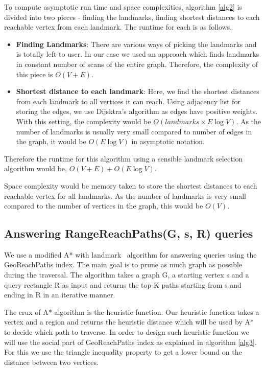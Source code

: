 {\begin{algorithm}[t]
\begin{scriptsize}
\end{scriptsize}
\end{algorithm}

To compute asymptotic run time and space complexities, algorithm \ref{alg2} is divided into two pieces - finding the landmarks, finding shortest distances to each reachable vertex from each landmark. The runtime for each is as follows,
\begin{itemize}
	\item \textbf{Finding Landmarks}: There are various ways of picking the landmarks and is totally left to user. In our case we used an approach which finds landmarks in constant number of scans of the entire graph. Therefore, the complexity of this piece is $O(V + E)$.

	\item \textbf{Shortest distance to each landmark}: Here, we find the shortest distances from each landmark to all vertices it can reach. Using adjacency list for storing the edges, we use Dijsktra's algorithm as edges have positive weights. With this setting, the complexity would be $O(landmarks \times E\log V)$. As the number of landmarks is usually very small compared to number of edges in the graph, it would be $O(E\log V)$ in asymptotic notation.
\end{itemize}

Therefore the runtime for this algorithm using a sensible landmark selection algorithm would be, $O(V + E) + O(E\log V)$.

Space complexity would be memory taken to store the shortest distances to each reachable vertex for all landmarks. As the number of landmarks is very small compared to the number of vertices in the graph, this would be $O(V)$.

\subsection{Answering RangeReachPaths(G, s, R) queries} \label{querying}

We use a modified A* with landmark~\cite{AC2005} algorithm for answering {\rrp} queries using the GeoReachPaths index. The main goal is to prune as much graph as possible during the traversal. The algorithm takes a graph G, a starting vertex s and a query rectangle R as input and returns the top-K paths starting from s and ending in R in an iterative manner.

The crux of A* algorithm is the heuristic function. Our heuristic function takes a vertex and a region and returns the heuristic distance which will be used by A* to decide which path to traverse. In order to design such heuristic function we will use the social part of GeoReachPaths index as explained in algorithm \ref{alg3}. For this we use the triangle inequality property to get a lower bound on the distance between two vertices.

}
